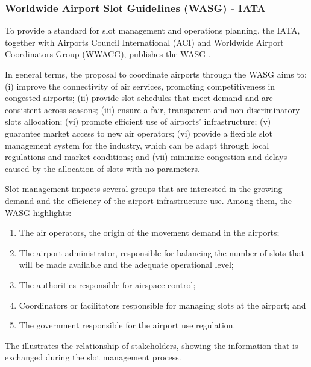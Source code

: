 \subsubsection{Worldwide Airport Slot GuideIines (WASG) - IATA}
To provide a standard for slot management and operations planning, the IATA, together with Airports Council International (ACI) and Worldwide Airport Coordinators Group (WWACG), publishes the WASG \cite{WASG2020}.

In general terms, the proposal to coordinate airports through the WASG aims to: (i) improve the connectivity of air services, promoting competitiveness in congested airports; (ii) provide slot schedules that meet demand and are consistent across seasons; (iii) ensure a fair, transparent and non-discriminatory slots allocation; (vi) promote efficient use of airports’ infrastructure; (v) guarantee market access to new air operators; (vi) provide a flexible slot management system for the industry, which can be adapt through local regulations and market conditions; and (vii) minimize congestion and delays caused by the allocation of slots with no parameters.

Slot management impacts several groups that are interested in the growing demand and the efficiency of the airport infrastructure use. Among them, the WASG highlights: 

\begin{enumerate}
	\item The air operators, the origin of the movement demand in the airports;
	\item The airport administrator, responsible for balancing the number of slots that will be made available and the adequate operational level;
	\item The authorities responsible for airspace control; 
	\item Coordinators or facilitators responsible for managing slots at the airport; and
        \item The government responsible for the airport use regulation.
\end{enumerate}%

The  illustrates the relationship of stakeholders, showing the information that is exchanged during the slot management process.

%


